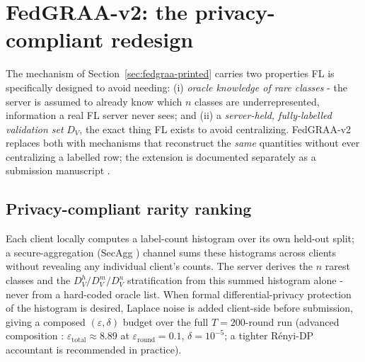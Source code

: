 \documentclass[11pt,a4paper]{report}
\begin{document}
\section{FedGRAA-v2: the privacy-compliant redesign}
\label{sec:v2methodology}

The mechanism of Section~\ref{sec:fedgraa-printed} carries two properties FL
is specifically designed to avoid needing: (i) \emph{oracle knowledge of rare
classes} - the server is assumed to already know which $n$ classes are
underrepresented, information a real FL server never sees; and (ii) a
\emph{server-held, fully-labelled validation set} $D_V$, the exact thing FL
exists to avoid centralizing. FedGRAA-v2 replaces both with mechanisms that
reconstruct the \emph{same} quantities without ever centralizing a labelled
row; the extension is documented separately as a submission manuscript
\cite{fedgraa2026submission}.

\subsection{Privacy-compliant rarity ranking}
Each client locally computes a label-count histogram over its own held-out
split; a secure-aggregation (SecAgg \cite{bonawitz2017secagg}) channel sums
these histograms across clients without revealing any individual client's
counts. The server derives the $n$ rarest classes and the
$D_V^h/D_V^m/D_V^n$ stratification from this summed histogram alone - never
from a hard-coded oracle list. When formal differential-privacy protection of
the histogram is desired, Laplace noise is added client-side before
submission, giving a composed $(\varepsilon,\delta)$ budget over the full
$T=200$-round run (advanced composition \cite{dwork2010composition}:
$\varepsilon_{\mathrm{total}}\approx8.89$ at $\varepsilon_{\mathrm{round}}=0.1$,
$\delta=10^{-5}$; a tighter R\'enyi-DP accountant is recommended in practice).
\end{document}

